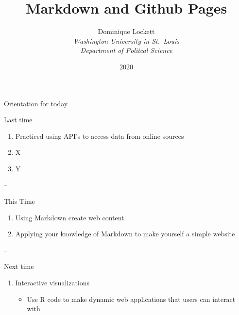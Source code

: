 \documentclass[
  ignorenonframetext,
]{beamer}
\title{Markdown and Github Pages}
\author{Dominique Lockett\\
\emph{Washington University in St.~Louis}\\
\emph{Department of Politcal Science}}
\date{2020}
\providecommand{\tightlist}{%
  \setlength{\itemsep}{0pt}\setlength{\parskip}{0pt}}
\begin{document}
\frame{\titlepage}

\begin{frame}

\end{frame}

\begin{frame}{Orientation for today}
\protect\hypertarget{orientation-for-today}{}

Last time

\begin{enumerate}
\item
  Practiced using API's to access data from online sources
\item
  X
\item
  Y
\end{enumerate}

--

This Time

\begin{enumerate}
\item
  Using Markdown create web content
\item
  Applying your knowledge of Markdown to make yourself a simple website
\end{enumerate}

--

Next time

\begin{enumerate}
\tightlist
\item
  Interactive visualizations

  \begin{itemize}
  \tightlist
  \item
    Use R code to make dynamic web applications that users can interact
    with
  \end{itemize}
\end{enumerate}

\end{frame}
\end{document}
